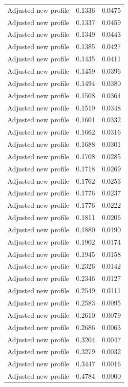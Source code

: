 \begin{table}[htbp]
\begin{tabular}{lll}
Adjusted new profile & 0.1336 & 0.0475 \\
Adjusted new profile & 0.1337 & 0.0459 \\
Adjusted new profile & 0.1349 & 0.0443 \\
Adjusted new profile & 0.1385 & 0.0427 \\
Adjusted new profile & 0.1435 & 0.0411 \\
Adjusted new profile & 0.1459 & 0.0396 \\
Adjusted new profile & 0.1494 & 0.0380 \\
Adjusted new profile & 0.1508 & 0.0364 \\
Adjusted new profile & 0.1519 & 0.0348 \\
Adjusted new profile & 0.1601 & 0.0332 \\
Adjusted new profile & 0.1662 & 0.0316 \\
Adjusted new profile & 0.1688 & 0.0301 \\
Adjusted new profile & 0.1708 & 0.0285 \\
Adjusted new profile & 0.1718 & 0.0269 \\
Adjusted new profile & 0.1762 & 0.0253 \\
Adjusted new profile & 0.1776 & 0.0237 \\
Adjusted new profile & 0.1776 & 0.0222 \\
Adjusted new profile & 0.1811 & 0.0206 \\
Adjusted new profile & 0.1880 & 0.0190 \\
Adjusted new profile & 0.1902 & 0.0174 \\
Adjusted new profile & 0.1945 & 0.0158 \\
Adjusted new profile & 0.2326 & 0.0142 \\
Adjusted new profile & 0.2346 & 0.0127 \\
Adjusted new profile & 0.2549 & 0.0111 \\
Adjusted new profile & 0.2583 & 0.0095 \\
Adjusted new profile & 0.2610 & 0.0079 \\
Adjusted new profile & 0.2686 & 0.0063 \\
Adjusted new profile & 0.3204 & 0.0047 \\
Adjusted new profile & 0.3279 & 0.0032 \\
Adjusted new profile & 0.3447 & 0.0016 \\
Adjusted new profile & 0.4784 & 0.0000 \\
\bottomrule
\end{tabular}
\end{table}
